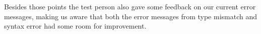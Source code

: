 Besides those points the test person also gave some feedback on our current error messages, making us aware that both the error messages from type mismatch and syntax error had some room for improvement.









